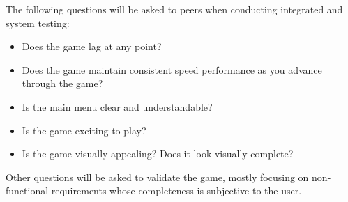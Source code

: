 \documentclass[12pt, titlepage]{article}
\begin{document}
The following questions will be asked to peers when conducting integrated and system testing:
\begin{itemize}
\item Does the game lag at any point?
\item Does the game maintain consistent speed performance as you advance through the game?
\item Is the main menu clear and understandable?
\item Is the game exciting to play?
\item Is the game visually appealing? Does it look visually complete?
\end{itemize}
Other questions will be asked to validate the game, mostly focusing on non-functional requirements whose completeness is subjective to the user.
\end{document}
